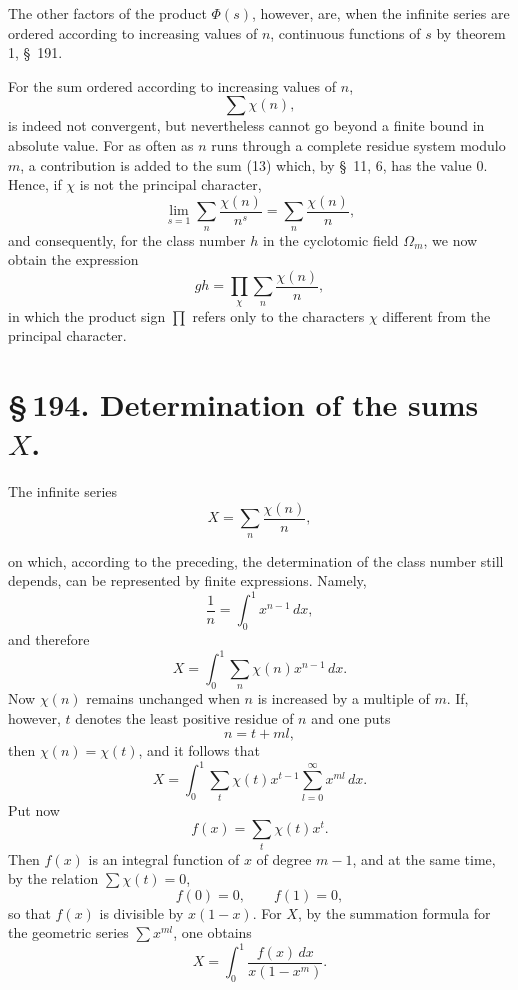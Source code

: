 \documentclass[11pt]{article}
\begin{document}
The other factors of the product $\Phi(s)$, however, are, when the infinite series are ordered according to increasing values of $n$, continuous functions of $s$ by theorem 1, \S~191.

For the sum ordered according to increasing values of $n$,
\begin{equation}
\sum\chi(n),
\tag{13}
\end{equation}
is indeed not convergent, but nevertheless cannot go beyond a finite bound in absolute value. For as often as $n$ runs through a complete residue system modulo $m$, a contribution is added to the sum (13) which, by \S~11, 6, has the value $0$. Hence, if $\chi$ is not the principal character,
\begin{equation}
\lim_{s=1}\sum_n\frac{\chi(n)}{n^s}=\sum_n\frac{\chi(n)}{n},
\tag{14}
\end{equation}
and consequently, for the class number $h$ in the cyclotomic field $\Omega_m$, we now obtain the expression
\begin{equation}
gh=\prod_\chi\sum_n\frac{\chi(n)}{n},
\tag{15}
\end{equation}
in which the product sign $\prod$ refers only to the characters $\chi$ different from the principal character.

\section*{\S\,194. Determination of the sums $X$.}

The infinite series
\begin{equation}
X=\sum_n\frac{\chi(n)}{n},
\tag{1}
\end{equation}

on which, according to the preceding, the determination of the class number still depends, can be represented by finite expressions. Namely,
\[
\frac1n=\int_0^1x^{n-1}\,dx,
\]
and therefore
\[
X=\int_0^1\sum_n\chi(n)x^{n-1}\,dx.
\]
Now $\chi(n)$ remains unchanged when $n$ is increased by a multiple of $m$. If, however, $t$ denotes the least positive residue of $n$ and one puts
\[
n=t+ml,
\]
then $\chi(n)=\chi(t)$, and it follows that
\[
X=\int_0^1\sum_t\chi(t)x^{t-1}\sum_{l=0}^{\infty}x^{ml}\,dx.
\]
Put now
\begin{equation}
f(x)=\sum_t\chi(t)x^t.
\tag{2}
\end{equation}
Then $f(x)$ is an integral function of $x$ of degree $m-1$, and at the same time, by the relation $\sum\chi(t)=0$,
\begin{equation}
f(0)=0,\qquad f(1)=0,
\tag{3}
\end{equation}
so that $f(x)$ is divisible by $x(1-x)$. For $X$, by the summation formula for the geometric series $\sum x^{ml}$, one obtains
\begin{equation}
X=\int_0^1\frac{f(x)\,dx}{x(1-x^m)}.
\tag{4}
\end{equation}
\end{document}
